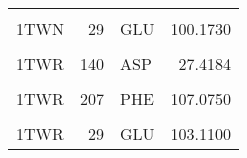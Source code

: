 \begin{table}
\begin{tabular}{lrlr}
			\addlinespace
			\cellcolor{gray!6}{1TWN} & \cellcolor{gray!6}{25} & \cellcolor{gray!6}{HIS} & \cellcolor{gray!6}{113.5160}\\
			1TWN & 29 & GLU & 100.1730\\
			\cellcolor{gray!6}{1TWR} & \cellcolor{gray!6}{138} & \cellcolor{gray!6}{LEU} & \cellcolor{gray!6}{75.0669}\\
			1TWR & 140 & ASP & 27.4184\\
			\cellcolor{gray!6}{1TWR} & \cellcolor{gray!6}{142} & \cellcolor{gray!6}{SER} & \cellcolor{gray!6}{129.2760}\\
			\addlinespace
			1TWR & 207 & PHE & 107.0750\\
			\cellcolor{gray!6}{1TWR} & \cellcolor{gray!6}{25} & \cellcolor{gray!6}{HIS} & \cellcolor{gray!6}{108.8640}\\
			1TWR & 29 & GLU & 103.1100\\
			\bottomrule
		\end{tabular}
	\end{table}


